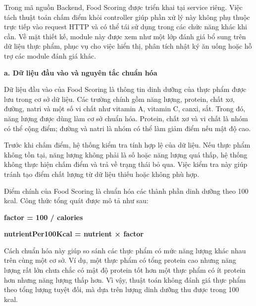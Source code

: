 \documentclass[12pt, a4paper]{report}
\begin{document}
Trong mã nguồn Backend, Food Scoring được triển khai tại service riêng. Việc tách thuật toán chấm điểm khỏi controller giúp phần xử lý này không phụ thuộc trực tiếp vào request HTTP và có thể tái sử dụng trong các chức năng khác khi cần. Về mặt thiết kế, module này được xem như một lớp đánh giá bổ sung trên dữ liệu thực phẩm, phục vụ cho việc hiển thị, phân tích nhật ký ăn uống hoặc hỗ trợ các module đánh giá khác.

\textbf{a. Dữ liệu đầu vào và nguyên tắc chuẩn hóa}

Dữ liệu đầu vào của Food Scoring là thông tin dinh dưỡng của thực phẩm được lưu trong cơ sở dữ liệu. Các trường chính gồm năng lượng, protein, chất xơ, đường, natri và một số vi chất như vitamin A, vitamin C, canxi, sắt. Trong đó, năng lượng được dùng làm cơ sở chuẩn hóa. Protein, chất xơ và vi chất là nhóm có thể cộng điểm; đường và natri là nhóm có thể làm giảm điểm nếu mật độ cao.

Trước khi chấm điểm, hệ thống kiểm tra tính hợp lệ của dữ liệu. Nếu thực phẩm không tồn tại, năng lượng không phải là số hoặc năng lượng quá thấp, hệ thống không thực hiện chấm điểm và trả về trạng thái bỏ qua. Việc kiểm tra này giúp tránh tạo điểm chất lượng từ dữ liệu thiếu hoặc không phù hợp.

Điểm chính của Food Scoring là chuẩn hóa các thành phần dinh dưỡng theo 100 kcal. Công thức tổng quát được mô tả như sau:

\textbf{factor = 100 / calories}

\textbf{nutrientPer100Kcal = nutrient × factor}

Cách chuẩn hóa này giúp so sánh các thực phẩm có mức năng lượng khác nhau trên cùng một cơ sở. Ví dụ, một thực phẩm có tổng protein cao nhưng năng lượng rất lớn chưa chắc có mật độ protein tốt hơn một thực phẩm có ít protein hơn nhưng năng lượng thấp hơn. Vì vậy, thuật toán không đánh giá thực phẩm theo tổng lượng tuyệt đối, mà dựa trên lượng dinh dưỡng thu được trong 100 kcal.
\end{document}
